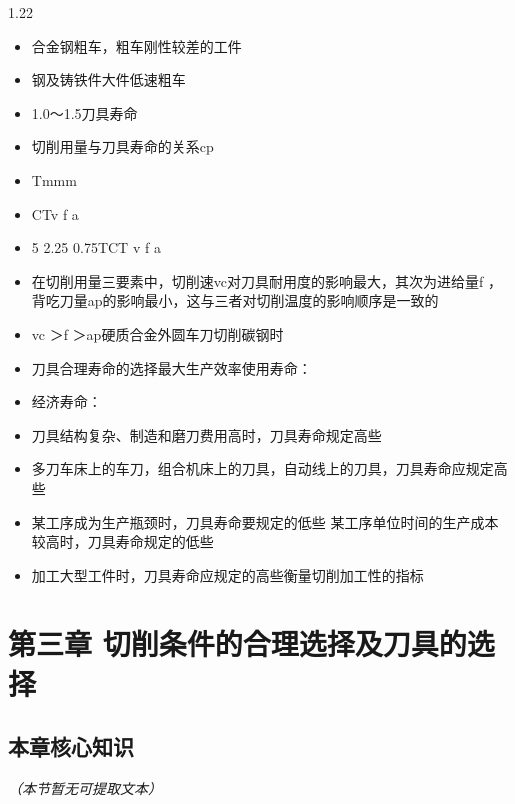 \documentclass[12pt,a4paper]{article}
\begin{document}
\begin{spacing}{1.22}
\begin{itemize}[leftmargin=2.2em,label=--]
  \item 合金钢粗车，粗车刚性较差的工件
  \item 钢及铸铁件大件低速粗车
  \item 1.0～1.5刀具寿命
  \item 切削用量与刀具寿命的关系cp
  \item Tmmm
  \item CTv f a
  \item 5 2.25 0.75TCT v f a
  \item 在切削用量三要素中，切削速vc对刀具耐用度的影响最大，其次为进给量f ，背吃刀量ap的影响最小，这与三者对切削温度的影响顺序是一致的
  \item vc ＞f ＞ap硬质合金外圆车刀切削碳钢时
  \item 刀具合理寿命的选择最大生产效率使用寿命：
  \item 经济寿命：
  \item 刀具结构复杂、制造和磨刀费用高时，刀具寿命规定高些
  \item 多刀车床上的车刀，组合机床上的刀具，自动线上的刀具，刀具寿命应规定高些
  \item 某工序成为生产瓶颈时，刀具寿命要规定的低些 某工序单位时间的生产成本较高时，刀具寿命规定的低些
  \item 加工大型工件时，刀具寿命应规定的高些衡量切削加工性的指标
\end{itemize}

\section{第三章 切削条件的合理选择及刀具的选择}
\subsection{本章核心知识}
\textit{（本节暂无可提取文本）}


\end{spacing}
\end{document}

